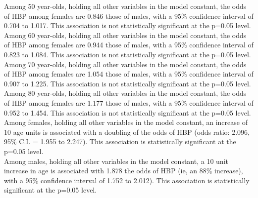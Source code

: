 \documentclass{article}
\begin{document}
\noindent Among 50 year-olds, holding all other variables in the model constant, the odds of HBP among females are 0.846 those of males, with a 95\% confidence interval of 0.704 to 1.017. This association is not statistically significant at the p=0.05 level.\\

\noindent Among 60 year-olds, holding all other variables in the model constant, the odds of HBP among females are 0.944 those of males, with a 95\% confidence interval of 0.823 to 1.084. This association is not statistically significant at the p=0.05 level.\\

\noindent Among 70 year-olds, holding all other variables in the model constant, the odds of HBP among females are 1.054 those of males, with a 95\% confidence interval of 0.907 to 1.225. This association is not statistically significant at the p=0.05 level. \\

\noindent Among 80 year-olds, holding all other variables in the model constant, the odds of HBP among females are 1.177 those of males, with a 95\% confidence interval of 0.952 to 1.454. This association is not statistically significant at the p=0.05 level. \\

\noindent Among females, holding all other variables in the model constant, an increase of 10 age units is associated with a doubling of the odds of HBP (odds ratio: 2.096, 95\% C.I. = 1.955 to 2.247). This association is statistically significant at the p=0.05 level.\\

\noindent Among males, holding all other variables in the model constant, a 10 unit increase in age is associated with 1.878 the odds of HBP (ie, an 88\% increase), with a 95\% confidence interval of 1.752 to 2.012). This association is statistically significant at the p=0.05 level. \\
\end{document}
